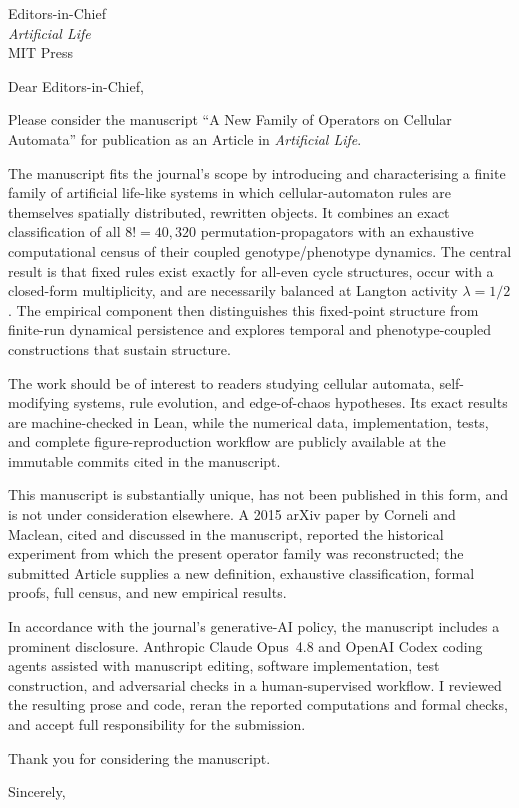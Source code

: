 \documentclass[11pt]{letter}
\begin{document}
\begin{letter}{%
Editors-in-Chief\\
\textit{Artificial Life}\\
MIT Press}

\opening{Dear Editors-in-Chief,}

Please consider the manuscript ``A New Family of Operators on Cellular
Automata'' for publication as an Article in \textit{Artificial Life}.

The manuscript fits the journal's scope by introducing and characterising a
finite family of artificial life-like systems in which cellular-automaton rules
are themselves spatially distributed, rewritten objects. It combines an exact
classification of all \(8!=40{,}320\) permutation-propagators with an exhaustive
computational census of their coupled genotype/phenotype dynamics. The central
result is that fixed rules exist exactly for all-even cycle structures, occur
with a closed-form multiplicity, and are necessarily balanced at Langton
activity \(\lambda=1/2\). The empirical component then distinguishes this
fixed-point structure from finite-run dynamical persistence and explores
temporal and phenotype-coupled constructions that sustain structure.

The work should be of interest to readers studying cellular automata,
self-modifying systems, rule evolution, and edge-of-chaos hypotheses. Its exact
results are machine-checked in Lean, while the numerical data, implementation,
tests, and complete figure-reproduction workflow are publicly available at the
immutable commits cited in the manuscript.

This manuscript is substantially unique, has not been published in this form,
and is not under consideration elsewhere. A 2015 arXiv paper by Corneli and
Maclean, cited and discussed in the manuscript, reported the historical
experiment from which the present operator family was reconstructed; the
submitted Article supplies a new definition, exhaustive classification,
formal proofs, full census, and new empirical results.

In accordance with the journal's generative-AI policy, the manuscript includes
a prominent disclosure. Anthropic Claude Opus~4.8 and OpenAI Codex coding
agents assisted with manuscript editing, software implementation, test
construction, and adversarial checks in a human-supervised workflow. I reviewed
the resulting prose and code, reran the reported computations and formal
checks, and accept full responsibility for the submission.

Thank you for considering the manuscript.

\closing{Sincerely,}

\end{letter}
\end{document}

